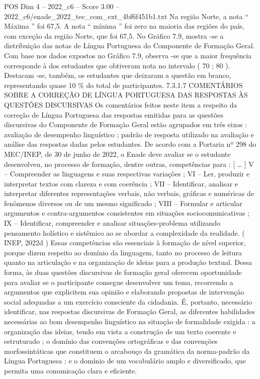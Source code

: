\begin{textsample}{POS Dim 4 – 2022\_c6 – Score 3.00 – 2022\_c6/enade\_2022\_tec\_com\_ext\_4bf6f451b1.txt}
Na região Norte, a nota “ Máxima ” foi 67,5.
A nota “ mínima ” foi zero na maioria das regiões do país, com exceção da região Norte, que foi 67,5.
No Gráfico 7.9, mostra -se a distribuição das notas de Língua Portuguesa do Componente de Formação Geral.
Com base nos dados expostos no Gráfico 7.9, observa -se que a maior frequência corresponde à dos estudantes que obtiveram nota no intervalo ( 70 ; 80 ).
Destacam -se, também, os estudantes que deixaram a questão em branco, representando quase 10 \% do total de participantes. 7.3.1.7 COMENTÁRIOS SOBRE A CORREÇÃO DE LÍNGUA PORTUGUESA DAS RESPOSTAS ÀS QUESTÕES DISCURSIVAS Os comentários feitos neste item a respeito da correção de Língua Portuguesa das respostas emitidas para as questões discursivas do Componente de Formação Geral estão agrupados em três eixos : avaliação de desempenho linguístico ; padrão de resposta utilizado na avaliação e análise das respostas dadas pelos estudantes.
De acordo com a Portaria nº 298 do MEC/INEP, de 30 de junho de 2022, o Enade deve avaliar se o estudante desenvolveu, no processo de formação, dentre outras, competências para : [ … ] V – Compreender as linguagens e suas respectivas variações ; VI – Ler, produzir e interpretar textos com clareza e com coerência ; VII – Identificar, analisar e interpretar diferentes representações verbais, não verbais, gráficas e numéricas de fenômenos diversos ou de um mesmo significado ; VIII – Formular e articular argumentos e contra-argumentos consistentes em situações sociocomunicativas ; IX – Identificar, compreender e analisar situações-problema utilizando pensamento holístico e sistêmico ao se abordar a complexidade da realidade. ( INEP, 2022d ) Essas competências são essenciais à formação de nível superior, porque dizem respeito ao domínio da linguagem, tanto no processo de leitura quanto na articulação e na organização de ideias para a produção textual.
Dessa forma, às duas questões discursivas de formação geral oferecem oportunidade para avaliar se o participante consegue desenvolver um tema, recorrendo a argumentos que explicitem sua opinião e elaborando propostas de intervenção social adequadas a um exercício consciente da cidadania.
É, portanto, necessário identificar, nas respostas discursivas de Formação Geral, as diferentes habilidades necessárias ao bom desempenho linguístico na situação de formalidade exigida : a organização das ideias, tendo em vista a construção de um texto coerente e estruturado ; o domínio das convenções ortográficas e das convenções morfossintáticas que constituem o arcabouço da gramática da norma-padrão da Língua Portuguesa ; e o domínio de um vocabulário amplo e diversificado, que permita uma comunicação clara e eficiente.

\end{textsample}
